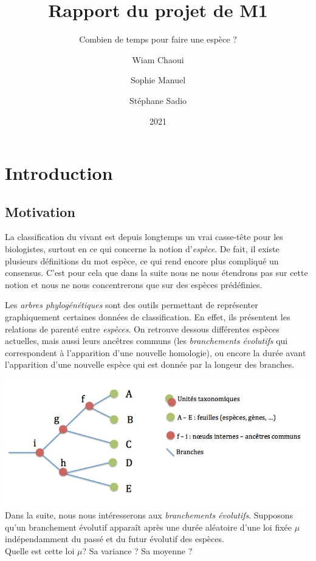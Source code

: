 \documentclass[
]{book}
\title{Rapport du projet de M1}
\subtitle{Combien de temps pour faire une espèce ?}
\author{Wiam Chaoui \and Sophie Manuel \and Stéphane Sadio}
\date{2021}
\theoremstyle{definition}
\theoremstyle{definition}
\theoremstyle{definition}
\theoremstyle{definition}
\theoremstyle{remark}
\begin{document}
\maketitle

{
\setcounter{tocdepth}{1}
\tableofcontents
}
\newtheorem{dfn}{Définition}
\newtheorem{exem}{Exemple}
\newtheorem{corol}{Corollaire}
\newtheorem{prop}{Proposition}
\newtheorem{lem}{Lemme}
\newtheorem{demo}{Démonstration}
\newtheorem{rem}{Remarque}
\newtheorem{propri}{Propriété}
\newtheorem{thm}{Théorème}
\newtheorem{cmtr}{Commentaire}

\hypertarget{intro}{%
\chapter{Introduction}\label{intro}}

\hypertarget{motivation}{%
\section{Motivation}\label{motivation}}

\hspace*{0.5cm}
La classification du vivant est depuis longtemps un vrai casse-tête pour les biologistes, surtout en ce qui concerne la notion d'\emph{espèce}. De fait, il existe plusieurs définitions du mot espèce, ce qui rend encore plus compliqué un consensus. C'est pour cela que dans la suite nous ne nous étendrons pas sur cette notion et nous ne nous concentrerons que sur des espèces prédéfinies.

Les \emph{arbres phylogénétiques} sont des outils permettant de représenter graphiquement certaines données de classification. En effet, ils présentent les relations de parenté entre \emph{espèces}. On retrouve dessous différentes espèces actuelles, mais aussi leurs ancêtres communs (les \emph{branchements évolutifs} qui correspondent à l'apparition d'une nouvelle homologie), ou encore la durée avant l'apparition d'une nouvelle espèce qui est donnée par la longeur des branches.

\includegraphics{Images/arbre_intro.jpg}
Dans la suite, nous nous intéresserons aux \emph{branchements évolutifs}.
Supposons qu'un branchement évolutif apparaît après une durée aléatoire d'une loi fixée \(\mu\) indépendamment du passé et du futur évolutif des espèces.\\
Quelle est cette loi \(\mu\)? Sa variance ? Sa moyenne ? \newline
\end{document}
